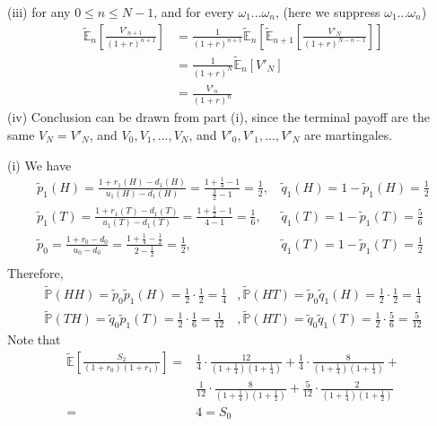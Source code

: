 \documentclass[12pt]{article}
\newenvironment{exercise}[2][Exercise]{\begin{trivlist}
		\item[\hskip \labelsep {\bfseries #1}\hskip \labelsep {\bfseries #2.}]}{\end{trivlist}}
\begin{document}
	(iii) for any $0\le n\le N-1$, and for every $\omega_1...\omega_n$, (here we suppress $\omega_1...\omega_n$)
	\begin{align*}
	\tilde{\mathbb{E}}_n\left[\frac{V'_{n+1}}{(1+r)^{n+1}}\right] &= \frac{1}{(1+r)^{n+1}}\tilde{\mathbb{E}}_n\left[\tilde{\mathbb{E}}_{n+1}\left[\frac{V'_N}{(1+r)^{N-n-1}}\right]\right]\\
	&=\frac{1}{(1+r)^{N}}\tilde{\mathbb{E}}_n\left[V'_N\right]\\
	&=\frac{V'_n}{(1+r)^n}
	\end{align*}
	(iv) Conclusion can be drawn from part (i), since the terminal payoff are the same $V_N = V'_N$, and $V_0,V_1,...,V_N$, and $V'_0,V'_1,...,V'_N$ are martingales. 
	\begin{exercise}{9}\end{exercise}
	(i) We have
	\begin{align*}\tilde{p}_1(H) = \frac{1+r_1(H)-d_1(H)}{u_1(H)-d_1(H)} = \frac{1+\frac{1}{4}-1}{\frac{3}{2}-1} =\frac{1}{2},&\,\tilde{q}_1(H)=1-\tilde{p}_1(H) = \frac{1}{2}\\
	\tilde{p}_1(T) = \frac{1+r_1(T)-d_1(T)}{u_1(T)-d_1(T)} = \frac{1+\frac{1}{2}-1}{4-1} =\frac{1}{6},&\,\tilde{q}_1(T)=1-\tilde{p}_1(T) = \frac{5}{6}\\
	\tilde{p}_0 = \frac{1+r_0-d_0}{u_0-d_0} = \frac{1+\frac{1}{4}-\frac{1}{2}}{2-\frac{1}{2}} =\frac{1}{2},&\,\tilde{q}_1(T)=1-\tilde{p}_1(T) = \frac{1}{2}\\ \end{align*}
	Therefore, 
	\begin{align*}
	\tilde{\mathbb{P}}(HH)=\tilde{p}_0\tilde{p}_1(H) = \frac{1}{2}\cdot\frac{1}{2} = \frac{1}{4} &, \tilde{\mathbb{P}}(HT)=\tilde{p}_0\tilde{q}_1(H) = \frac{1}{2}\cdot\frac{1}{2} = \frac{1}{4}\\
	\tilde{\mathbb{P}}(TH)=\tilde{q}_0\tilde{p}_1(T) = \frac{1}{2}\cdot\frac{1}{6} = \frac{1}{12} &, \tilde{\mathbb{P}}(HT)=\tilde{q}_0\tilde{q}_1(T) = \frac{1}{2}\cdot\frac{5}{6} = \frac{5}{12}
	\end{align*}
	Note that 
	\begin{align*}
	\tilde{\mathbb{E}}\left[\frac{S_2}{(1+r_0)(1+r_1)}\right] = & \frac{1}{4}\cdot\frac{12}{(1+\frac{1}{4})(1+\frac{1}{4})} + \frac{1}{4}\cdot\frac{8}{(1+\frac{1}{4})(1+\frac{1}{4})} +\\ &\frac{1}{12}\cdot\frac{8}{(1+\frac{1}{4})(1+\frac{1}{2})} + \frac{5}{12}\cdot\frac{2}{(1+\frac{1}{4})(1+\frac{1}{2})}\\
	=&4 = S_0
	\end{align*}
\end{document}
